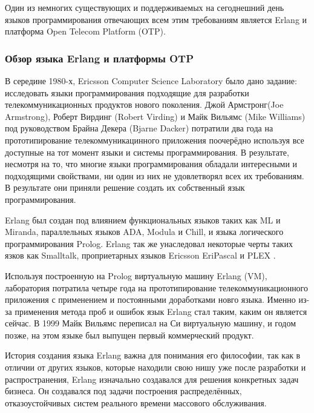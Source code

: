 \begin{par}
Один из немногих существующих и поддерживаемых на сегоднешний день языков программирования
отвечающих всем этим требованиям является Erlang и платформа Open Telecom Platform (OTP).
\end{par}

\subsubsection{Обзор языка Erlang и платформы OTP}

\begin{par}
В середине 1980-х, Ericsson Computer Science Laboratory было дано задание: исследовать языки
программирования подходящие для разработки телекоммуникационных продуктов нового поколения.
Джой Армстронг(Joe Armstrong), Роберт Вирдинг (Robert Virding) и Майк Вильямс (Mike Williams) под
руководством Брайна Декера (Bjarne Dacker) потратили два года на прототипирование
телекоммуникацинного приложения поочерёдно  используя все доступные на тот момент языки и
системы программирования. В результате, несмотря на то, что многие языки программирования обладали
интересными и подходящими свойствами, ни один из них не удовлетворял всех их требованиям. В результате
они приняли решение создать их собственный язык программирования.
\end{par}

\begin{par}
Erlang был создан под влиянием функциональных языков таких как  ML и Miranda, параллельных языков
ADA, Modula и Chill, и языка логического программирования Prolog. Erlang так же унаследовал некоторые
черты таких язков как Smalltalk, проприетарных языков Ericsson EriPascal и PLEX \cite{erlang}.
\end{par}

\begin{par}
Используя построенную на Prolog виртуальную машину Erlang (VM), лаборатория потратила  четыре года на
прототипирование телекоммуникационного приложения с применением и постоянными доработками новго языка.
Именно из-за применения метода проб и ошибок язык Erlang стал таким, каким он является сейчас. В 1999
Майк Вильямс переписал на Си виртуальную машину, и годом позже, на этом языке был выпущен первый
коммерческий продукт. 
\end{par}

\begin{par}
История создания языка Erlang важна для понимания его философии, так как в отличии от других языков,
которые находили свою нишу уже после разработки и распространения, Erlang изначально создавался
для решения конкретных задач бизнеса. Он создавался под задачи построения распределённых,
отказоустойчивых систем реального времени массового обслуживания.
\end{par}

